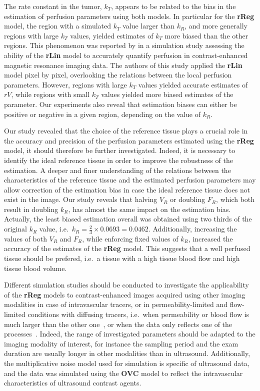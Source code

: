 The rate constant in the tumor, $k_T$, appears to be related to the bias in the estimation of perfusion parameters using both models.
In particular for the \textbf{rReg} model, the region with a simulated $k_T$ value larger than $k_R$, and more generally regions with large $k_T$ values, yielded estimates of $k_T$ more biased than the other regions.
This phenomenon was reported by \citet{CardenasRodriguez:2013em} in a simulation study assessing the ability of the \textbf{rLin} model to accurately quantify perfusion in contrast-enhanced magnetic resonance imaging data.
The authors of this study applied the \textbf{rLin} model pixel by pixel, overlooking the relations between the local perfusion parameters.
However, regions with large $k_T$ values yielded accurate estimates of $rV$, while regions with small $k_T$ values yielded more biased estimates of the parameter.
Our experiments also reveal that estimation biases can either be positive or negative in a given region, depending on the value of $k_R$.

Our study revealed that the choice of the reference tissue plays a crucial role in the accuracy and precision of the perfusion parameters estimated using the \textbf{rReg} model, it should therefore be further investigated.
Indeed, it is necessary to identify the ideal reference tissue in order to improve the robustness of the estimation.
A deeper and finer understanding of the relations between the characteristics of the reference tissue and the estimated perfusion parameters may allow correction of the estimation bias in case the ideal reference tissue does not exist in the image.
Our study reveals that halving $V_R$ or doubling $F_R$, which both result in doubling $k_R$, has almost the same impact on the estimation bias.
Actually, the least biased estimation overall was obtained using two thirds of the original $k_R$ value, i.e.~$k_R = \frac{2}{3} \times 0.0693 = 0.0462$.
Additionally, increasing the values of both $V_R$ and $F_R$, while enforcing fixed values of $k_R$, increased the accuracy of the estimates of the \textbf{rReg} model.
This suggests that a well perfused tissue should be prefered, i.e.~a tissue with a high tissue blood flow and high tissue blood volume.

Different simulation studies should be conducted to investigate the applicability of the \textbf{rReg} models to contrast-enhanced images acquired using other imaging modalities in case of intravascular tracers, or in permeability-limited and flow-limited conditions with diffusing tracers, i.e.~when permeability or blood flow is much larger than the other one~\cite{Tofts:1999ih}, or when the data only reflects one of the processes~\cite{Balvay:2005ca}. 
Indeed, the range of investigated parameters should be adapted to the imaging modality of interest, for instance the sampling period and the exam duration are usually longer in other modalities than in ultrasound.
Additionally, the multiplicative noise model used for simulation is specific of ultrasound data, and the data was simulated using the \textbf{OVC} model to reflect the intravascular characteristics of ultrasound contrast agents. 


